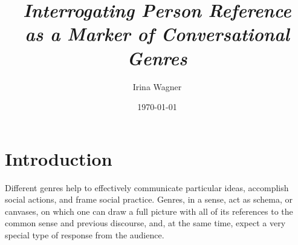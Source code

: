 \documentclass[12pt, draft]{article}
\title{\textit{Interrogating Person Reference \\ as a Marker of Conversational Genres}}
\author{\vspace{50pt} Irina Wagner}
\date{\today}
\begin{document}
\begin{titlingpage}
\setlength{\droptitle}{100pt}
\maketitle
\end{titlingpage}
\doublespacing
\indent

\section{Introduction}
Different genres help to effectively communicate particular ideas, accomplish social actions, and frame social practice. Genres, in a sense, act as schema, or canvases, on which one can draw a full picture with all of its references to the common sense and previous discourse, and, at the same time, expect a very special type of response from the audience. 
\end{document}
